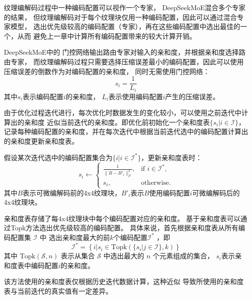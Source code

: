 纹理编解码过程中一种编码配置可以视作一个专家，
DeepSeekMoE\cite{dai2024deepseekmoe}混合多个专家的结果，
但纹理编解码对于每个纹理块仅用一种编码配置，因此可以通过混合专家模型，
选出优先级较高的编码配置（专家），再在这些编码配置中选出最佳的一个，从而
避免上一章中计算所有编码配置带来的较大计算开销。

DeepSeekMoE\cite{dai2024deepseekmoe}中的
门控网络输出路由专家对输入的亲和度，并根据亲和度选择路由专家，
而纹理编解码过程只需要选择压缩误差最小的编码配置，因此可以使用压缩误差的倒数作为对编码配置的亲和度，
同时无需使用门控网络：
\begin{equation}
s_i=\frac{1}{L_i}
\end{equation}
其中$s_i$表示编码配置$i$的亲和度，
$L_i$表示使用编码配置$i$产生的压缩误差。

由于优化过程迭代进行，每次优化时数据发生的变化较小，可以使用之前迭代中计算出的亲和度
近似当前迭代的亲和度。即优化前初始化一个亲和度表$\{s_i|i\in\mathcal{I}\}$，
记录每种编码配置的亲和度，并在每次迭代中根据当前迭代选中的编码配置计算出的亲和度更新亲和度表。

假设某次迭代选中的编码配置集合为$\{i|i\in\mathcal{I}^*\}$，更新亲和度表时：
\begin{equation}
    s_i\leftarrow
    \begin{cases} 
    \frac{1}{\|B-B'_i\|_F^2}, & \text{if } i\in\mathcal{I}^*,\\
    s_i, & \text{otherwise}.
    \end{cases}
\end{equation}
其中$B$表示可微编解码前的4x4纹理块，$B'_i$表示$B$使用编码配置$i$可微编解码后的4x4纹理块。

亲和度表存储了每4x4纹理块中每个编码配置对应的亲和度。
基于亲和度表可以通过Topk方法选出优先级较高的编码配置。
具体来说，首先根据亲和度表从所有编码配置集 $\mathcal{I}$ 中
选出亲和度最大的前$k$个编码配置$\mathcal{I}^*$ ，即
\begin{equation}
\label{eq41}
\mathcal{I}^*=\left\{i|s_i\in\text{Topk}(\{s_i|j\in\mathcal{I}\},k)\right\}
\end{equation}
其中 $\text{Topk}(\mathcal{S},n)$ 表示从集合 $\mathcal{S}$ 中选出最大的 $n$ 个元素组成的集合，
$s_i$表示亲和度表中编码配置$i$的亲和度。

该方法使用的亲和度表仅根据历史迭代数据计算，这种近似
导致所使用的亲和度表与当前迭代的真实值有一定差异。

